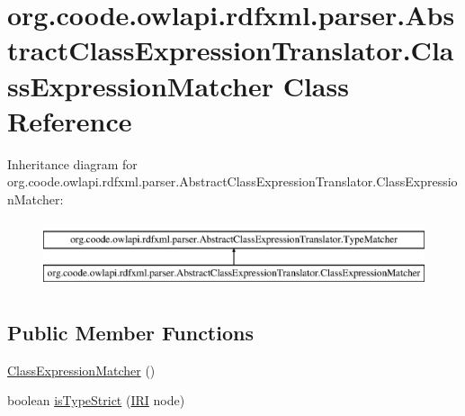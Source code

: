 \hypertarget{classorg_1_1coode_1_1owlapi_1_1rdfxml_1_1parser_1_1_abstract_class_expression_translator_1_1_class_expression_matcher}{\section{org.\-coode.\-owlapi.\-rdfxml.\-parser.\-Abstract\-Class\-Expression\-Translator.\-Class\-Expression\-Matcher Class Reference}
\label{classorg_1_1coode_1_1owlapi_1_1rdfxml_1_1parser_1_1_abstract_class_expression_translator_1_1_class_expression_matcher}
}
Inheritance diagram for org.\-coode.\-owlapi.\-rdfxml.\-parser.\-Abstract\-Class\-Expression\-Translator.\-Class\-Expression\-Matcher\-:\begin{figure}[H]
\begin{center}
\leavevmode
\includegraphics[height=2.000000cm]{classorg_1_1coode_1_1owlapi_1_1rdfxml_1_1parser_1_1_abstract_class_expression_translator_1_1_class_expression_matcher}
\end{center}
\end{figure}
\subsection*{Public Member Functions}
\begin{DoxyCompactItemize}
\item 
\hyperlink{classorg_1_1coode_1_1owlapi_1_1rdfxml_1_1parser_1_1_abstract_class_expression_translator_1_1_class_expression_matcher_a8da1d927067e60d180c4dc6f0dabf9ed}{Class\-Expression\-Matcher} ()
\item 
boolean \hyperlink{classorg_1_1coode_1_1owlapi_1_1rdfxml_1_1parser_1_1_abstract_class_expression_translator_1_1_class_expression_matcher_a1c4ae3519c8eefdc8c82ec5c252a179d}{is\-Type\-Strict} (\hyperlink{classorg_1_1semanticweb_1_1owlapi_1_1model_1_1_i_r_i}{I\-R\-I} node)
\end{DoxyCompactItemize}


